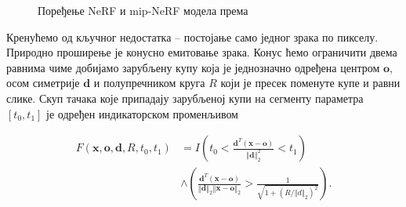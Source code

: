 \documentclass[12pt, a4paper, twoside]{book}
\numberwithin{equation}{chapter}
\numberwithin{theorem}{section}
\numberwithin{definition}{section}
\numberwithin{definitionChapter}{chapter}
\begin{document}
\begin{figure}[H]
	\begin{center}
	\end{center}
	\caption{Поређење NeRF и mip-NeRF модела према \cite{mip-nerf}}
	\label{fig-nerf-vs-mipnerf}
\end{figure}

Кренућемо од кључног недостатка -- постојање само једног зрака по пикселу. Природно проширење
је конусно емитовање зрака. Конус ћемо ограничити двема равнима чиме добијамо зарубљену купу
која је једнозначно одређена центром $\mathbf{o}$, осом симетрије $\mathbf{d}$ и полупречником
круга $R$ који је пресек поменуте купе и равни слике. Скуп тачака које припадају зарубљеној купи
на сегменту параметра $\left[t_0, t_1\right]$ је одређен индикаторском променљивом

\begin{equation}
	\begin{split}
		F(\mathbf{x}, \mathbf{o}, \mathbf{d}, R, t_0, t_1) & =
			I \left(t_0 < \frac{\mathbf{d}^T(\mathbf{x} - \mathbf{o})}{\left\Vert\mathbf{d}\right\Vert^2_2} < t_1 \right) \\
			& \land
			\left(
				\frac{\mathbf{d}^T(\mathbf{x} - \mathbf{o})}
				{\left\Vert\mathbf{d}\right\Vert_2 \left\Vert \mathbf{x} - \mathbf{o}\right\Vert_2}
				> \frac{1}{\sqrt{1 + (R / \left\Vert d\right\Vert_2)^2}}
			\right).
	\end{split}
\end{equation}
\end{document}
